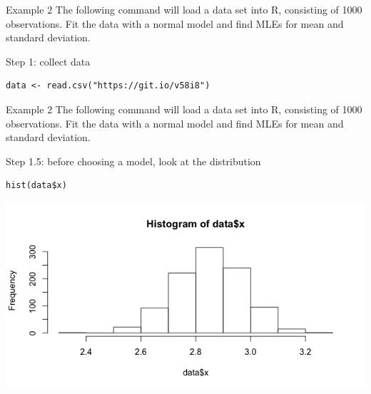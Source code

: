 \documentclass[presentation]{beamer}
\begin{document}
\begin{frame}[fragile,label=sec-17]{Example 2}
 The following command will load a data set into R, consisting of 1000 observations.  Fit the data with a normal model and find MLEs for mean and standard deviation.

\vspace{5mm}

Step 1: collect data

\begin{verbatim}
data <- read.csv("https://git.io/v58i8")
\end{verbatim}
\end{frame}


\begin{frame}[fragile,label=sec-18]{Example 2}
 The following command will load a data set into R, consisting of 1000 observations.  Fit the data with a normal model and find MLEs for mean and standard deviation.

\vspace{5mm}

Step 1.5: before choosing a model, look at the distribution

\begin{verbatim}
hist(data$x)
\end{verbatim}

\includegraphics[width=.9\linewidth]{figures/week2/normalHistogram.png}
\end{frame}
\end{document}
